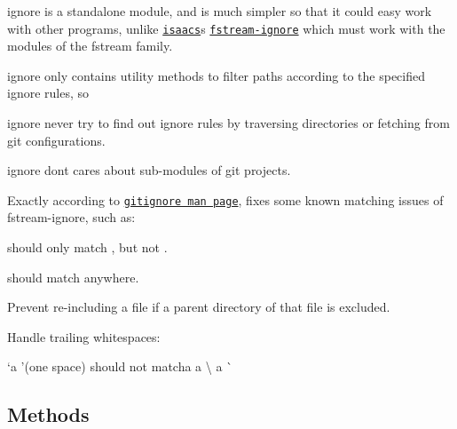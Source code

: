 \begin{DoxyItemize}
\item {\ttfamily ignore} is a standalone module, and is much simpler so that it could easy work with other programs, unlike \href{https://npmjs.org/~isaacs}{\tt isaacs}\textquotesingle{}s \href{https://npmjs.org/package/fstream-ignore}{\tt fstream-\/ignore} which must work with the modules of the fstream family.
\item {\ttfamily ignore} only contains utility methods to filter paths according to the specified ignore rules, so
\begin{DoxyItemize}
\item {\ttfamily ignore} never try to find out ignore rules by traversing directories or fetching from git configurations.
\item {\ttfamily ignore} don\textquotesingle{}t cares about sub-\/modules of git projects.
\end{DoxyItemize}
\item Exactly according to \href{http://git-scm.com/docs/gitignore}{\tt gitignore man page}, fixes some known matching issues of fstream-\/ignore, such as\+:
\begin{DoxyItemize}
\item {}\textquotesingle{} should only match \textquotesingle{}, but not \textquotesingle{}.
\item {}\textquotesingle{} should match \textquotesingle{} anywhere.
\item Prevent re-\/including a file if a parent directory of that file is excluded.
\item Handle trailing whitespaces\+:
\begin{DoxyItemize}
\item `\textquotesingle{}a '{\ttfamily (one space) should not match}\textquotesingle{}a \textquotesingle{}a \textbackslash{} \textquotesingle{}a \textquotesingle{}\`{}
\end{DoxyItemize}
\end{DoxyItemize}
\end{DoxyItemize}

\subsection*{Methods}

